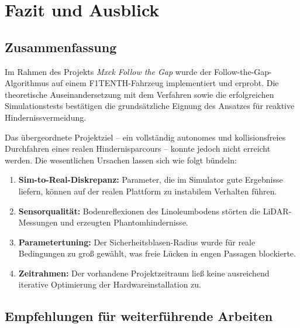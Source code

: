 \chapter{Fazit und Ausblick}
\label{chap:fazit}

\section{Zusammenfassung}
\label{sec:summary}

Im Rahmen des Projekts \emph{Mxck Follow the Gap} wurde der
Follow-the-Gap-Algorithmus auf einem F1TENTH-Fahrzeug implementiert
und erprobt.
Die theoretische Auseinandersetzung mit dem Verfahren sowie die
erfolgreichen Simulationstests bestätigen die grundsätzliche
Eignung des Ansatzes für reaktive Hindernissvermeidung.

Das übergeordnete Projektziel -- ein vollständig autonomes und
kollisionsfreies Durchfahren eines realen Hindernisparcours --
konnte jedoch nicht erreicht werden.
Die wesentlichen Ursachen lassen sich wie folgt bündeln:

\begin{enumerate}[label=\arabic*., leftmargin=*]
  \item \textbf{Sim-to-Real-Diskrepanz:}
        Parameter, die im Simulator gute Ergebnisse liefern, können
        auf der realen Plattform zu instabilem Verhalten führen.
  \item \textbf{Sensorqualität:}
        Bodenreflexionen des Linoleum\-bodens störten die
        LiDAR-Messungen und erzeugten Phantomhindernisse.
  \item \textbf{Parametertuning:}
        Der Sicherheitsblasen-Radius wurde für reale Bedingungen
        zu groß gewählt, was freie Lücken in engen Passagen blockierte.
  \item \textbf{Zeitrahmen:}
        Der vorhandene Projektzeitraum ließ keine ausreichend iterative
        Optimierung der Hardwareinstallation zu.
\end{enumerate}

\section{Empfehlungen für weiterführende Arbeiten}
\label{sec:future_work}

